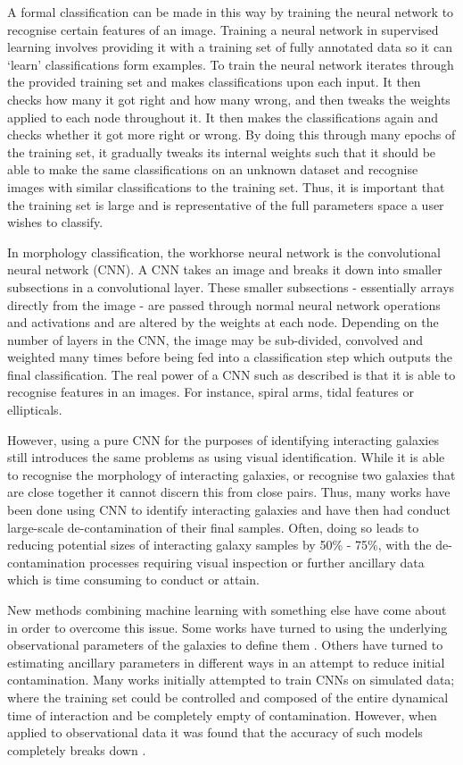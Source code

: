 A formal classification can be made in this way by training the neural network to recognise certain features of an image. Training a neural network in supervised learning involves providing it with a training set of fully annotated data so it can `learn' classifications form examples. To train the neural network iterates through the provided training set and makes classifications upon each input. It then checks how many it got right and how many wrong, and then tweaks the weights applied to each node throughout it. It then makes the classifications again and checks whether it got more right or wrong. By doing this through many epochs of the training set, it gradually tweaks its internal weights such that it should be able to make the same classifications on an unknown dataset and recognise images with similar classifications to the training set. Thus, it is important that the training set is large and is representative of the full parameters space a user wishes to classify.

In morphology classification, the workhorse neural network is the convolutional neural network (CNN). A CNN takes an image and breaks it down into smaller subsections in a convolutional layer. These smaller subsections - essentially arrays directly from the image - are passed through normal neural network operations and activations and are altered by the weights at each node. Depending on the number of layers in the CNN, the image may be sub-divided, convolved and weighted many times before being fed into a classification step which outputs the final classification. The real power of a CNN such as described is that it is able to recognise features in an images. For instance, spiral arms, tidal features or ellipticals. 

However, using a pure CNN for the purposes of identifying interacting galaxies still introduces the same problems as using visual identification. While it is able to recognise the morphology of interacting galaxies, or recognise two galaxies that are close together it cannot discern this from close pairs. Thus, many works have been done using CNN to identify interacting galaxies and have then had conduct large-scale de-contamination of their final samples. Often, doing so leads to reducing potential sizes of interacting galaxy samples by 50\% - 75\%, with the de-contamination processes requiring visual inspection or further ancillary data which is time consuming to conduct or attain.

New methods combining machine learning with something else have come about in order to overcome this issue. Some works have turned to using the underlying observational parameters of the galaxies to define them \citep{2023ApJ...958...96R}. Others have turned to estimating ancillary parameters in different ways in an attempt to reduce initial contamination. Many works initially attempted to train CNNs on simulated data; where the training set could be controlled and composed of the entire dynamical time of interaction and be completely empty of contamination. However, when applied to observational data it was found that the accuracy of such models completely breaks down \citep{2019MNRAS.490.5390B, 2020A&C....3200390C}.

